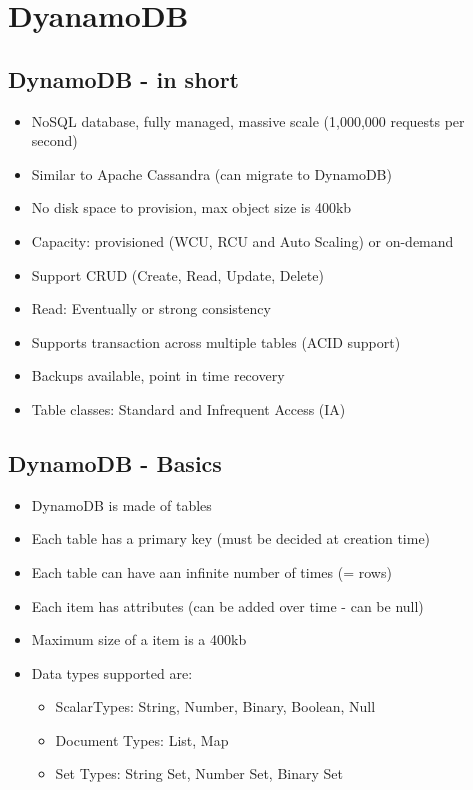 \section{DyanamoDB}

\subsection{DynamoDB - in short}
\begin{itemize}
    \item NoSQL database, fully managed, massive scale (1,000,000 requests per second)
    \item Similar to Apache Cassandra (can migrate to DynamoDB)
    \item No disk space to provision, max object size is 400kb
    \item Capacity: provisioned (WCU, RCU and Auto Scaling) or on-demand
    \item Support CRUD (Create, Read, Update, Delete)
    \item Read: Eventually or strong consistency
    \item Supports transaction across multiple tables (ACID support)
    \item Backups available, point in time recovery
    \item Table classes: Standard and Infrequent Access (IA)
\end{itemize}

\subsection{DynamoDB - Basics}
\begin{itemize}
    \item DynamoDB is made of tables
    \item Each table has a primary key (must be decided at creation time)
    \item Each table can have aan infinite number of times (= rows)
    \item Each item has attributes (can be added over time - can be null)
    \item Maximum size of a item is a 400kb
    \item Data types supported are:
    \begin{itemize}
        \item ScalarTypes: String, Number, Binary, Boolean, Null
        \item Document Types: List, Map
        \item Set Types: String Set, Number Set, Binary Set
    \end{itemize}
\end{itemize}

